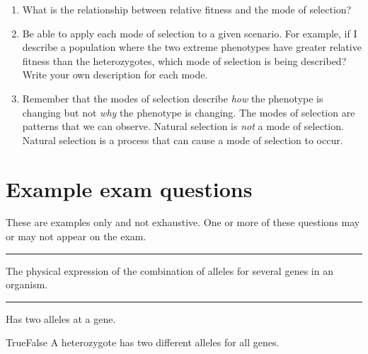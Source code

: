 \documentclass[letterpaper]{tufte-handout}
\begin{document}
\begin{enumerate}
	\item What is the relationship between relative fitness and the mode of selection?

	\item Be able to apply each mode of selection to a given scenario.  For example, if I describe a population where the two extreme phenotypes have greater relative fitness than the heterozygotes, which mode of selection is being described?  Write your own description for each mode.
	
	\item Remember that the modes of selection describe \emph{how} the phenotype is changing but not \emph{why} the phenotype is changing. The modes of selection are patterns that we can observe. Natural selection is \emph{not} a mode of selection. Natural selection is a process that can cause a mode of selection to occur. 
	
\end{enumerate}


\section*{Example exam questions}

These are examples only and not exhaustive. One or more of these questions may or may not appear on the exam.

\bigskip

\noindent \rule{1in}{0.4pt} The physical expression of the combination of alleles for several genes in an organism.

\bigskip

\noindent \rule{1in}{0.4pt} Has two alleles at a gene.


\vspace*{4\baselineskip}

\noindent True\hspace{1em}False\hspace{1em} A heterozygote has two different alleles for all genes.
\end{document}
